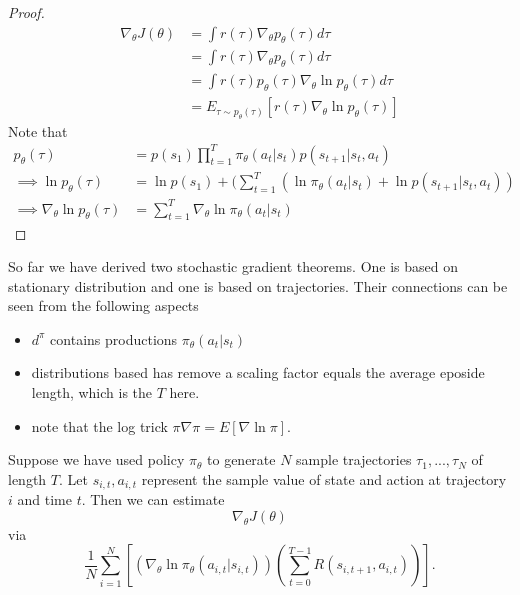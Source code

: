 \begin{refsection}
\begin{theorem}
\end{theorem}
\begin{proof}
	\begin{align*}
	\nabla_{\theta}J(\theta) &= \int r(\tau)\nabla_{\theta}  p_\theta(\tau) d\tau \\
	&= \int r(\tau)\nabla_{\theta} p_\theta(\tau) d\tau \\
	&= \int r(\tau) p_\theta(\tau) \nabla_{\theta} \ln p_\theta(\tau) d\tau \\ 
	&= E_{\tau\sim p_\theta(\tau)}[r(\tau) \nabla_{\theta} \ln p_\theta(\tau)]
	\end{align*}
	Note that 
	\begin{align*}
	p_\theta(\tau) &= p(s_1)\prod_{t=1}^T \pi_{\theta}(a_t|s_t)p(s_{t+1}|s_t,a_t) \\
	\implies \ln p_\theta(\tau) &= \ln p(s_1) + (\sum_{t=1}^T( \ln \pi_{\theta}(a_t|s_t) + \ln p(s_{t+1}|s_t, a_t)) \\
	\implies \nabla_{\theta}\ln p_\theta(\tau) &=\sum_{t=1}^T \nabla_{\theta} \ln \pi_{\theta}(a_t|s_t)
	\end{align*}
\end{proof}


\begin{remark}
So far we have derived two stochastic gradient theorems. One is based on stationary distribution and one is based on trajectories. 
Their connections can be seen from the following aspects
\begin{itemize}
	\item $d^\pi$ contains productions $\pi_\theta(a_t|s_t)$
	\item distributions based has remove a scaling factor equals the average eposide length, which is the $T$ here.
	\item note that the log trick $\pi \nabla \pi = E[\nabla \ln \pi]$.
\end{itemize}	
	

\end{remark}


\begin{remark}
	Suppose we have used policy $\pi_{\theta}$ to generate $N$ sample trajectories $\tau_1,...,\tau_N$ of length $T$. Let $s_{i,t}, a_{i,t}$ represent the sample value of state and action at trajectory $i$ and time $t$. Then we can estimate 
	$$\nabla_{\theta}J(\theta)$$
	via
	$$\frac{1}{N}\sum_{i=1}^N[( \nabla_{\theta} \ln \pi_\theta(a_{i,t}|s_{i,t}))(\sum_{t=0}^{T-1} R(s_{i,t+1}, a_{i,t}))].$$
\end{remark}


\end{refsection}
